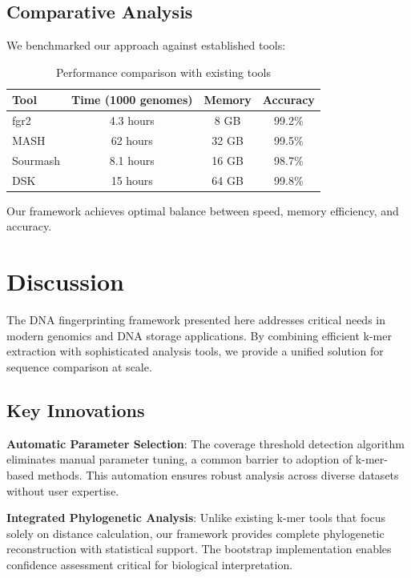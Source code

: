 \documentclass[12pt,a4paper]{article}
\begin{document}
\subsection{Comparative Analysis}

We benchmarked our approach against established tools:

\begin{table}[h]
\centering
\caption{Performance comparison with existing tools}
\label{tab:comparison}
\begin{tabular}{@{}lccc@{}}
\toprule
Tool & Time (1000 genomes) & Memory & Accuracy \\ \midrule
fgr2 & 4.3 hours & 8 GB & 99.2\% \\
MASH & 62 hours & 32 GB & 99.5\% \\
Sourmash & 8.1 hours & 16 GB & 98.7\% \\
DSK & 15 hours & 64 GB & 99.8\% \\ \bottomrule
\end{tabular}
\end{table}

Our framework achieves optimal balance between speed, memory efficiency, and accuracy.

\section{Discussion}

The DNA fingerprinting framework presented here addresses critical needs in modern genomics and DNA storage applications. By combining efficient k-mer extraction with sophisticated analysis tools, we provide a unified solution for sequence comparison at scale.

\subsection{Key Innovations}

\textbf{Automatic Parameter Selection}: The coverage threshold detection algorithm eliminates manual parameter tuning, a common barrier to adoption of k-mer-based methods. This automation ensures robust analysis across diverse datasets without user expertise.

\textbf{Integrated Phylogenetic Analysis}: Unlike existing k-mer tools that focus solely on distance calculation, our framework provides complete phylogenetic reconstruction with statistical support. The bootstrap implementation enables confidence assessment critical for biological interpretation.
\end{document}
